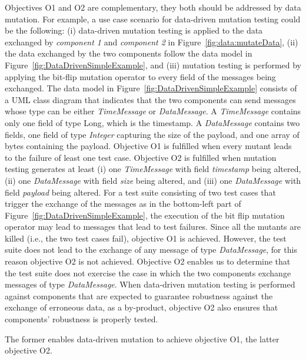 Objectives O1 and O2 are complementary, they both should be addressed by data mutation.
For example, a use case scenario for data-driven mutation testing could be the following: (i) data-driven mutation testing is applied to the data exchanged by \emph{component 1} and \emph{component 2} in Figure~\ref{fig:data:mutateData}, (ii) the data exchanged by the two components follow the data model in Figure~\ref{fig:DataDrivenSimpleExample}, and (iii) mutation testing is performed by applying the bit-flip mutation operator to every field of the messages being exchanged.
The data model in Figure~\ref{fig:DataDrivenSimpleExample} consists of a UML class diagram that indicates that the two components can send messages whose type can be either \emph{TimeMessage} or \emph{DataMessage}. A \emph{TimeMessage} contains only one field of type Long, which is the timestamp. 
A \emph{DataMessage} contains two fields, one field of type \emph{Integer} capturing the size of the payload, and one array of bytes containing the payload. 
Objective O1 is fulfilled when every mutant leads to the failure of least one test case.
Objective O2 is fulfilled when mutation testing generates at least (i) one \emph{TimeMessage} with field \emph{timestamp} being altered,
(ii) one \emph{DataMessage} with field \emph{size} being altered,
and (iii) one \emph{DataMessage} with field \emph{payload} being altered.
For a test suite consisting of two test cases that trigger the exchange of the messages as in the bottom-left part of Figure~\ref{fig:DataDrivenSimpleExample}, the execution of the bit flip mutation operator may lead to messages that lead to test failures. Since all the mutants are killed (i.e., the two test cases fail), objective O1 is achieved. However, the test suite does not lead to the exchange of any message of type \emph{DataMessage}, for this reason objective O2 is not achieved. Objective O2 enables us to determine that the test suite does not exercise the case in which the two components exchange messages of type \emph{DataMessage}. When data-driven mutation testing is performed against components that are expected to guarantee robustness against the exchange of erroneous data, as a by-product, objective O2 also ensures that components' robustness is properly tested.



The former enables data-driven mutation to achieve objective O1, the latter objective O2. 

